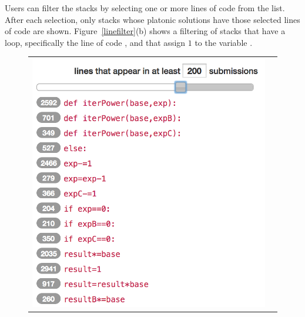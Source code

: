 Users can filter the stacks by selecting one or more lines of code from the list. After each selection, only stacks whose platonic solutions have those selected lines of code are shown. Figure~\ref{linefilter}(b) shows a filtering of stacks that have a  loop, specifically the line of code , and that assign $1$ to the variable .

\begin{figure}[htpb]
\begin{tabular}{c | c}
\begin{minipage}{.48\linewidth}
\centering
\includegraphics[scale=0.5]{Body/figures/overcode/lineSlider.png}
\end{minipage}
&
\begin{minipage}{.52\linewidth}
\centering

\end{minipage}
\end{tabular}
\end{figure}

